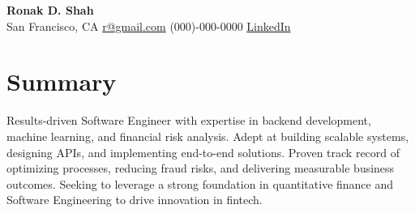 \documentclass[letterpaper,10pt]{article}
\begin{document}
\begin{center}
    \textbf{\Huge Ronak D. Shah}\\
    San Francisco, CA \hspace{1em} \href{mailto:r@gmail.com}{r@gmail.com} \hspace{1em} (000)-000-0000 \hspace{1em} \href{http://www.linkedin.com/in/}{LinkedIn}
\end{center}
\section*{Summary}
Results-driven Software Engineer with expertise in backend development, machine learning, and financial risk analysis. Adept at building scalable systems, designing APIs, and implementing end-to-end solutions. Proven track record of optimizing processes, reducing fraud risks, and delivering measurable business outcomes. Seeking to leverage a strong foundation in quantitative finance and Software Engineering to drive innovation in fintech.
\end{document}
